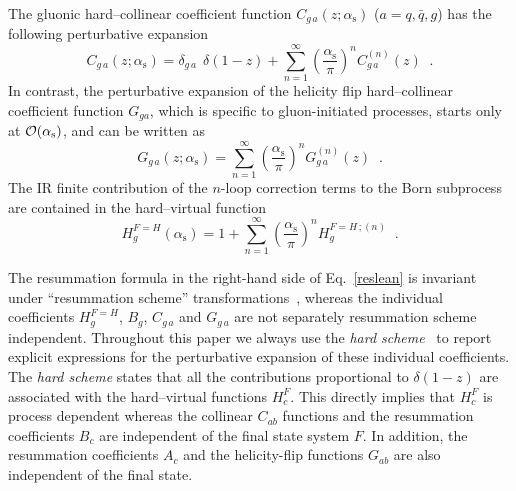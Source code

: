 \documentclass[12pt]{article}
\DeclareRobustCommand{\as}{\ensuremath{\alpha_{\mathrm{s}}}}
\begin{document}
The gluonic hard--collinear coefficient function $C_{g \,a}(z;\as)$ ($a=q,{\bar q},g$) has the following perturbative expansion
\begin{equation}
\label{cgexp} 
C_{g \,a}(z;\as) = \delta_{g \,a} \;\,\delta(1-z) + 
\sum_{n=1}^\infty \left( \frac{\as}{\pi} \right)^n C_{g\, a}^{(n)}(z) \;\;.
\end{equation}
In contrast, the perturbative expansion of the helicity flip hard--collinear coefficient function $G_{ga}$, which is specific to gluon-initiated processes, starts only at ${\cal O}(\as)$, and can be written as~\cite{Catani:2010pd,Catani:2013tia}
\begin{equation}
\label{gfexp}
G_{g \,a}(z;\as) =
\sum_{n=1}^\infty \left( \frac{\as}{\pi} \right)^n G_{g \,a}^{(n)}(z) \;\;.
\end{equation}
The IR finite contribution of the $n$-loop correction terms to the Born subprocess are contained in the hard--virtual function
\begin{equation}
\label{hexp}
H_g^{F=H}(\as) = 1+ \sum_{n=1}^\infty 
\left( \frac{\as}{\pi} \right)^n 
H_g^{F=H \,;(n)}
\;\;.
\end{equation} 

The resummation formula in the right-hand side of Eq.~\eqref{reslean} is invariant under ``resummation scheme''  transformations~\cite{Catani:2000vq}, whereas the individual coefficients $H_g^{F=H}$, $B_{g}$, $C_{g\, a}$ and $G_{g\, a}$ are not separately resummation scheme independent. Throughout this paper we always use the \textit{hard scheme}~\cite{Catani:2013tia} to report explicit expressions for the perturbative expansion of these individual coefficients. The \textit{hard scheme} states that all the contributions proportional to $\delta(1-z)$ are associated with the hard--virtual functions $H_c^{F}$. This directly implies that $H_c^{F}$ is process dependent whereas the collinear $C_{ab}$ functions and the resummation coefficients $B_{c}$ are independent of the final state system $F$. In addition, the resummation coefficients $A_{c}$ and the helicity-flip functions $G_{ab}$ are also independent of the final state.
\end{document}
